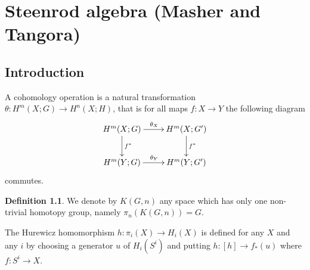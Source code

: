 \documentclass[A4,12pt,oneside]{book}
\theoremstyle{definition}
\newtheorem{defi}{Definition}
\begin{document}
        \newpage

%  

\chapter{Steenrod algebra (Masher and Tangora)}

\section{Introduction}

A cohomology operation is a natural transformation $\theta:H^m(X;G)\rightarrow H^n(X;H)$, that is for all maps $f:X\rightarrow Y$ the following diagram
\begin{displaymath}
\xymatrix{ 
H^m(X;G)\ar[r]^{\theta_X}\ar[d]^{f^*} &H^m(X;G')\ar[d]^{f^*} \\
H^m(Y;G)\ar[r]^{\theta_Y} &H^m(Y;G')
}
\end{displaymath}
commutes.
\begin{defi}
We denote by $K(G, n)$ any space which has only one non-trivial homotopy group, namely $\pi_n(K(G,n))=G$. 
\end{defi}
The Hurewicz homomorphism $h:\pi_i(X)\rightarrow H_i(X)$ is defined for any $X$ and any $i$ by choosing a generator $u$ of $H_i(S^i)$ and putting $h:[h]\rightarrow f_*(u)$ where $f:S^i\rightarrow X$. 
\end{document}
